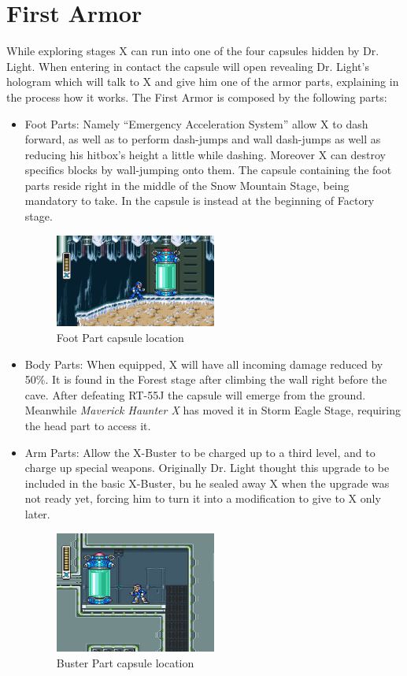 \section{First Armor}\label{X1:Armor}
While exploring stages X can run into one of the four capsules hidden by Dr. Light. When entering in contact the capsule will open revealing Dr. Light's hologram which will talk to X and give him one of the armor parts\cite{wiki:First_armor}, explaining in the process how it works.
The First Armor is composed by the following parts:
\begin{itemize}
	\item Foot Parts: Namely ``Emergency Acceleration System''\cite{X:Manual} allow X to dash forward, as well as to perform dash-jumps and wall dash-jumps as well as reducing his hitbox's height a little while dashing. Moreover X can destroy specifics blocks by wall-jumping onto them. The capsule containing the foot parts reside right in the middle of the Snow Mountain Stage, being mandatory to take. In \mhx the capsule is instead at the beginning of Factory stage.
	\begin{figure}[h]
		\centering
		\includegraphics[width=0.5\textwidth]{figures/X1/Armor_foot.jpg}
		\caption{Foot Part capsule location}
	\end{figure}
	
	\item Body Parts: When equipped, X will have all incoming damage reduced by 50\%. It is found in the Forest stage after climbing the wall right before the cave. After defeating RT-55J the capsule will emerge from the ground. Meanwhile \textit{Maverick Haunter X} has moved it in Storm Eagle Stage, requiring the head part to access it.
	
	\item Arm Parts: Allow the X-Buster to be charged up to a third level, and to charge up special weapons. Originally Dr. Light thought this upgrade to be included in the basic X-Buster\cite{X:Manual}, bu he sealed away X when the upgrade was not ready yet, forcing him to turn it into a modification to give to X only later.
	\begin{figure}[h]
		\centering
		\includegraphics[width=0.5\textwidth]{figures/X1/Flame_armor_2.jpg}
		\caption{Buster Part capsule location}
	\end{figure}


\end{itemize}
